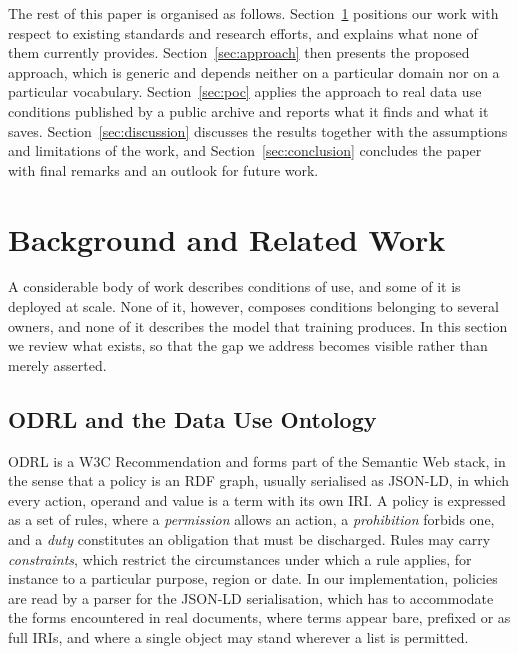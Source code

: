 \documentclass[sigconf,anonymous,review]{acmart}
\begin{document}
The rest of this paper is organised as follows. Section~\ref{sec:related}
positions our work with respect to existing standards and research efforts, and
explains what none of them currently provides. Section~\ref{sec:approach} then
presents the proposed approach, which is generic and depends neither on a
particular domain nor on a particular vocabulary. Section~\ref{sec:poc} applies
the approach to real data use conditions published by a public archive and
reports what it finds and what it saves. Section~\ref{sec:discussion} discusses
the results together with the assumptions and limitations of the work, and
Section~\ref{sec:conclusion} concludes the paper with final remarks and an
outlook for future work.

\section{Background and Related Work}
\label{sec:related}

A considerable body of work describes conditions of use, and some of it is
deployed at scale. None of it, however, composes conditions belonging to several
owners, and none of it describes the model that training produces. In this
section we review what exists, so that the gap we address becomes visible rather
than merely asserted.

\subsection{ODRL and the Data Use Ontology}

ODRL is a W3C Recommendation and forms part of the Semantic Web stack, in the
sense that a policy is an RDF graph, usually serialised as JSON-LD, in which
every action, operand and value is a term with its own IRI. A policy is expressed
as a set of rules, where a \emph{permission} allows an action, a
\emph{prohibition} forbids one, and a \emph{duty} constitutes an obligation that
must be discharged. Rules may carry \emph{constraints}, which restrict the
circumstances under which a rule applies, for instance to a particular purpose,
region or date. In our implementation, policies are read by a parser for the
JSON-LD serialisation, which has to accommodate the forms encountered in real
documents, where terms appear bare, prefixed or as full IRIs, and where a single
object may stand wherever a list is permitted.
\end{document}
